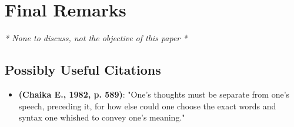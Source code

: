 \documentclass{Paper_Summary}
\begin{document}
\section{Final Remarks}
    \emph{* None to discuss, not the objective of this paper *}

\breakline

\begin{center}
    \section*{Possibly Useful Citations}
\end{center}

    \begin{itemize}
        \item \textbf{(Chaika E., 1982, p. 589)}: "One's thoughts must be separate from one's speech, preceding it, for how else could one choose the exact words and syntax one whished to convey one's meaning."
    \end{itemize}
\end{document}
